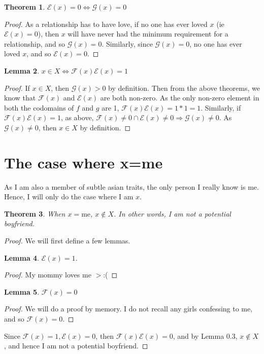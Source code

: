 \documentclass[11pt]{extarticle}
\newtheorem{theorem}{Theorem}[section]
\newtheorem{lemma}[theorem]{Lemma}
\theoremstyle{definition}
\begin{document}
\begin{theorem}
$\mathscr{E}(x)=0\Leftrightarrow\mathscr{G}(x)=0$
\end{theorem}
\begin{proof}
As a relationship has to have love, if no one has ever loved $x$ (ie $\mathscr{E}(x)=0$), then $x$ will have never had the minimum requirement for a relationship, and so $\mathscr{G}(x)=0$. Similarly, since $\mathscr{G}(x)=0$, no one has ever loved $x$, and so $\mathscr{E}(x)=0$. 
\end{proof}

\begin{lemma}
$x\in X\Leftrightarrow \mathscr{F}(x)\mathscr{E}(x)=1$
\end{lemma}
\begin{proof}
If $x\in X$, then $\mathscr{G}(x)>0$ by definition. Then from the above theorems, we know that $\mathscr{F}(x)$ and $\mathscr{E}(x)$ are both non-zero. As the only non-zero element in both the codomains of $f$ and $g$ are 1, $\mathscr{F}(x)\mathscr{E}(x)=1*1=1$. Similarly, if $\mathscr{F}(x)\mathscr{E}(x)=1$, as above, $\mathscr{F}(x)\neq0\cap \mathscr{E}(x)\neq0\Rightarrow\mathscr{G}(x)\neq0$. As $\mathscr{G}(x)\neq0$, then $x\in X$ by definition.
\end{proof}


\section{The case where x=me}
As I am also a member of subtle asian traits, the only person I really know is me. Hence, I will only do the case where I am $x$. 
\begin{theorem}
When $x=\text{me}$, $x\notin X$. In other words, I am not a potential boyfriend.
\end{theorem}
\begin{proof}
We will first define a few lemmas.

\begin{lemma}
$\mathscr{E}(x)=1$. 
\end{lemma}

\begin{proof}
My mommy loves me $>$:(
\end{proof}


\begin{lemma}
$\mathscr{F}(x)=0$
\end{lemma}

\begin{proof}
We will do a proof by memory. I do not recall any girls confessing to me, and so $\mathscr{F}(x)=0$. 
\end{proof}

Since $\mathscr{F}(x)=1,\mathscr{E}(x)=0$, then $\mathscr{F}(x)\mathscr{E}(x)=0$, and by Lemma 0.3, $x\notin X$, and hence I am not a potential boyfriend.
\end{proof}
\end{document}
